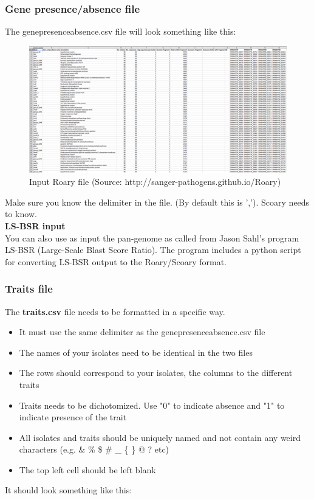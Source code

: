 \documentclass{article}
\begin{document}
      \subsubsection{Gene presence/absence file}
        The gene\textunderscore presence\textunderscore absence.csv file will look something like this:
        \begin{figure}[h!]
        \includegraphics[width=\linewidth]{images/gene_presence_and_absence.png}
        \caption{Input Roary file (Source: http://sanger-pathogens.github.io/Roary)}
        \label{fig:gpa}
        \end{figure}

        \noindent Make sure you know the delimiter in the file. (By default this is ','). Scoary needs to know.\\

        \textbf{LS-BSR input}\\
        You can also use as input the pan-genome as called from Jason Sahl's program LS-BSR (Large-Scale Blast Score Ratio). The program includes a python script for converting LS-BSR output to the Roary/Scoary format.

      \subsubsection{Traits file}
        The \textbf{traits.csv} file needs to be formatted in a specific way.
        \begin{itemize}
          \item It must use the same delimiter as the gene\textunderscore presence\textunderscore absence.csv file
          \item The names of your isolates need to be identical in the two files
          \item The rows should correspond to your isolates, the columns to the different traits
          \item Traits needs to be dichotomized. Use "0" to indicate absence and "1" to indicate presence of the trait
          \item All isolates and traits should be uniquely named and not contain any weird characters (e.g. \& \% \$ \# \_ \{ \} @ ? etc)
          \item The top left cell should be left blank
        \end{itemize}
        \noindent It should look something like this: \\
\end{document}

